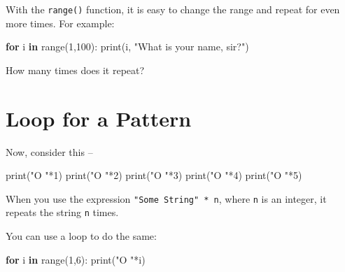\documentclass[
  letterpaper,
]{scrbook}
\newenvironment{Shaded}{\begin{snugshade}}{\end{snugshade}}
\newcommand{\BuiltInTok}[1]{\textcolor[rgb]{0.00,0.23,0.31}{#1}}
\newcommand{\ControlFlowTok}[1]{\textcolor[rgb]{0.00,0.23,0.31}{\textbf{#1}}}
\newcommand{\DecValTok}[1]{\textcolor[rgb]{0.68,0.00,0.00}{#1}}
\newcommand{\KeywordTok}[1]{\textcolor[rgb]{0.00,0.23,0.31}{\textbf{#1}}}
\newcommand{\NormalTok}[1]{\textcolor[rgb]{0.00,0.23,0.31}{#1}}
\newcommand{\OperatorTok}[1]{\textcolor[rgb]{0.37,0.37,0.37}{#1}}
\newcommand{\StringTok}[1]{\textcolor[rgb]{0.13,0.47,0.30}{#1}}
\begin{document}
With the \texttt{range()} function, it is easy to change the range and
repeat for even more times. For example:

\begin{Shaded}
\begin{Highlighting}[]
\ControlFlowTok{for}\NormalTok{ i }\KeywordTok{in} \BuiltInTok{range}\NormalTok{(}\DecValTok{1}\NormalTok{,}\DecValTok{100}\NormalTok{):}
    \BuiltInTok{print}\NormalTok{(i, }\StringTok{"What is your name, sir?"}\NormalTok{)}
\end{Highlighting}
\end{Shaded}

How many times does it repeat?

\section*{Loop for a Pattern}\label{loop-for-a-pattern}


Now, consider this --

\begin{Shaded}
\begin{Highlighting}[]
\BuiltInTok{print}\NormalTok{(}\StringTok{"O "}\OperatorTok{*}\DecValTok{1}\NormalTok{)}
\BuiltInTok{print}\NormalTok{(}\StringTok{"O "}\OperatorTok{*}\DecValTok{2}\NormalTok{)}
\BuiltInTok{print}\NormalTok{(}\StringTok{"O "}\OperatorTok{*}\DecValTok{3}\NormalTok{)}
\BuiltInTok{print}\NormalTok{(}\StringTok{"O "}\OperatorTok{*}\DecValTok{4}\NormalTok{)}
\BuiltInTok{print}\NormalTok{(}\StringTok{"O "}\OperatorTok{*}\DecValTok{5}\NormalTok{)}
\end{Highlighting}
\end{Shaded}

When you use the expression \texttt{"Some\ String"\ *\ n}, where
\texttt{n} is an integer, it repeats the string \texttt{n} times.

You can use a loop to do the same:

\begin{Shaded}
\begin{Highlighting}[]
\ControlFlowTok{for}\NormalTok{ i }\KeywordTok{in} \BuiltInTok{range}\NormalTok{(}\DecValTok{1}\NormalTok{,}\DecValTok{6}\NormalTok{):}
    \BuiltInTok{print}\NormalTok{(}\StringTok{"O "}\OperatorTok{*}\NormalTok{i)}
\end{Highlighting}
\end{Shaded}
\end{document}
